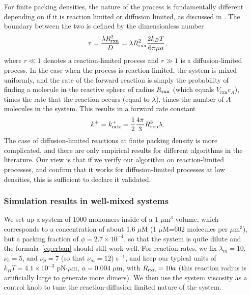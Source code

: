 \documentclass[11pt]{article}
\newcommand{\C}[1]{c_{#1}}
\begin{document}
For finite packing densities, the nature of the process is fundamentally different depending on if it is reaction limited or diffusion limited, as discussed in \cite{donev2018efficient}. The boundary between the two is defined by the dimensionless number
\begin{equation}
\label{eq:RDrat}
r = \frac{\lambda R_\text{rxn}^2}{D}=\lambda R_\text{rxn}^2 \frac{2 k_B T}{6 \pi \mu a},
\end{equation}
where $r \ll 1$ denotes a reaction-limited process and $r \gg 1$ is a diffusion-limited process. In the case when the process is reaction-limited, the system is mixed uniformly, and the rate of the forward reaction is simply the probability of finding a molecule in the reactive sphere of radius $R_\text{rxn}$ (which equals $V_\text{rxn} \C{A}$), times the rate that the reaction occurs (equal to $\lambda$), times the number of $A$ molecules in the system. This results in a forward rate constant \cite[Eq.~(2)]{donev2018efficient}
\begin{equation}
\label{eq:kmix}
k^+=k^+_\text{mix} = \frac{1}{2}\frac{4 \pi}{3} R_\text{rxn}^3 \lambda.
\end{equation}
The case of diffusion-limited reactions at finite packing density is more complicated, and there are only empirical results for different algorithms in the literature. Our view is that if we verify our algorithm on reaction-limited processes, and confirm that it works for diffusion-limited processes at low densities, this is sufficient to declare it validated.

\subsubsection{Simulation results in well-mixed systems \label{sec:simres}}
We set up a system of 1000 monomers inside of a 1 $\mu$m$^3$ volume, which corresponds to a concentration of about 1.6 $\mu$M (1 $\mu$M=602 molecules per $\mu$m$^3$), but a packing fraction of $\phi=2.7 \times 10^{-4}$, so that the system is quite dilute and the formula\ \eqref{eq:erban} should still work well. For reaction rates, we fix $\lambda_m=10$, $\nu_b=5$, and $\nu_p=7$  (so that $\nu_m=12$) s$^{-1}$, and keep our typical units of $k_B T=4.1 \times 10^{-3}$ pN$\cdot \mu$m, $a=0.004$ $\mu$m, with $R_\text{rxn} = 10a$ (this reaction radius is artificially large to generate more dimers). We then use the system viscosity as a control knob to tune the reaction-diffusion limited nature of the system. 
\end{document}
